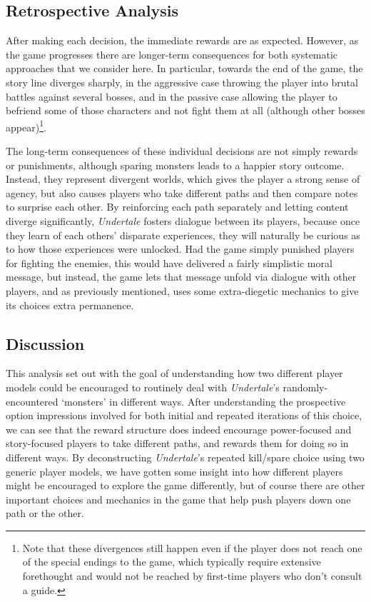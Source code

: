\documentclass[arts,article,submit,moreauthors,pdftex,10pt,a4paper]{Definitions/mdpi}
\begin{document}
\subsection{Retrospective Analysis}

After making each decision, the immediate rewards are as expected.
%
However, as the game progresses there are longer-term consequences for both systematic approaches that we consider here.
%
In particular, towards the end of the game, the story line diverges sharply, in the aggressive case throwing the player into brutal battles against several bosses, and in the passive case allowing the player to befriend some of those characters and not fight them at all (although other bosses appear)\footnote{Note that these divergences still happen even if the player does not reach one of the special endings to the game, which typically require extensive forethought and would not be reached by first-time players who don't consult a guide.}.


The long-term consequences of these individual decisions are not simply rewards or punishments, although sparing monsters leads to a happier story outcome.
%
Instead, they represent divergent worlds, which gives the player a strong sense of agency, but also causes players who take different paths and then compare notes to surprise each other.
%
By reinforcing each path separately and letting content diverge significantly, \emph{Undertale} fosters dialogue between its players, because once they learn of each others' disparate experiences, they will naturally be curious as to how those experiences were unlocked.
%
Had the game simply punished players for fighting the enemies, this would have delivered a fairly simplistic moral message, but instead, the game lets that message unfold via dialogue with other players, and as previously mentioned, uses some extra-diegetic mechanics to give its choices extra permanence.


\subsection{Discussion}

This analysis set out with the goal of understanding how two different player models could be encouraged to routinely deal with \emph{Undertale}'s randomly-encountered `monsters' in different ways.
%
After understanding the prospective option impressions involved for both initial and repeated iterations of this choice, we can see that the reward structure does indeed encourage power-focused and story-focused players to take different paths, and rewards them for doing so in different ways.
%
By deconstructing \emph{Undertale}'s repeated kill/spare choice using two generic player models, we have gotten some insight into how different players might be encouraged to explore the game differently, but of course there are other important choices and mechanics in the game that help push players down one path or the other.
\end{document}
